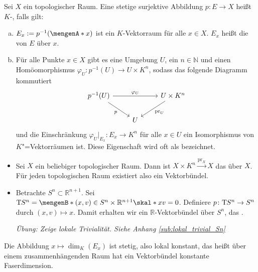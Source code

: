 \begin{definition}[{name=[$K$-Vektorbündel]},label=def_vektbuendel]
Sei $X$ ein topologischer Raum. Eine stetige surjektive Abbildung $p \colon E \to X$ heißt $K$-, falls gilt: 
\begin{enumerate}[a)]
	\item $ E_x := p^{-1}(\set{x})$ ist ein $K$-Vektorraum für alle $x \in X$. $E_x$ heißt die  von $E$ über $x$. 
	\item Für alle Punkte $x \in X$ gibt es eine Umgebung $U$, ein $n \in \mathds{N}$ und einen Homöomorphismus $\varphi_U \colon p^{-1}(U) \to U \times K^n$, sodass das 
	folgende 
	Diagramm kommutiert
	\[
		\begin{tikzcd}
			p^{-1}(U) \arrow["\varphi_U"]{rr} \drar["p"'] & & U \times K^n  \dlar["\mathrm{pr}_U"] \\
			& U 
		\end{tikzcd}
	\]
	und die Einschränkung $\varphi_U |_{E_x} \colon E_x \to K^n$ für alle $x \in U$ ein Isomorphismus von $K$"=Vektorräumen ist. Diese Eigenschaft wird oft als 
	 bezeichnet.
\end{enumerate}
\end{definition}

\begin{beispiel}
\leavevmode
\begin{itemize}
	\item Sei $X$ ein beliebiger topologischer Raum. Dann ist $X \times K^n \xrightarrow{\mathrm{pr}_X} X$ das  über $X$.
	Für jeden topologischen Raum existiert also ein Vektorbündel.
	\item Betrachte $S^n \subset \mathds{R}^{n+1}$. Sei $\Tmap S^n = \set[(x,v) \in S^n \times \mathds{R}^{n+1}]{\skal*{x}{v}=0}$. Definiere $p \colon \mathrm{T}\mkern-0.85mu S^n \to S^n$ 
	durch $(x,v) \mapsto x$. Damit erhalten wir ein $\mathds{R}$-Vektorbündel über $S^n$, das . 
	
	\emph{Übung: Zeige lokale Trivialität. Siehe Anhang \ref{sub:lokal_trivial_Sn}}
\end{itemize}	
\end{beispiel}

\begin{bemerkung}
Die Abbildung $x \mapsto \dim_K (E_x)$ ist stetig, also lokal konstant, das heißt über einem zusammenhängenden Raum hat ein Vektorbündel konstante Faserdimension. 	
\end{bemerkung}


